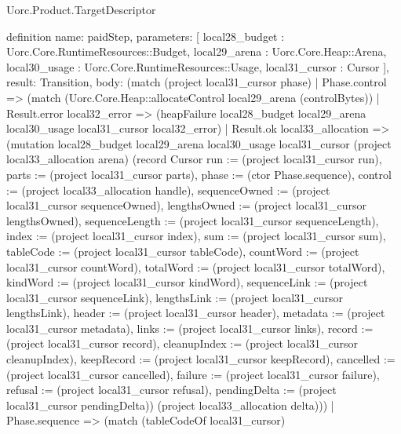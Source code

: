 \begin{lexlean}{Uorc.Product.TargetDescriptor}
\begin{semanticmodule}
definition{
  name: paidStep,
  parameters: [
    local28_budget : Uorc.Core.RuntimeResources::Budget,
    local29_arena : Uorc.Core.Heap::Arena,
    local30_usage : Uorc.Core.RuntimeResources::Usage,
    local31_cursor : Cursor
  ],
  result: Transition,
  body: (match (project local31_cursor phase)
    | Phase.control => (match (Uorc.Core.Heap::allocateControl local29_arena (controlBytes))
      | Result.error local32_error => (heapFailure local28_budget local29_arena local30_usage local31_cursor local32_error)
      | Result.ok local33_allocation => (mutation local28_budget local29_arena local30_usage local31_cursor (project local33_allocation arena) (record Cursor {run := (project local31_cursor run), parts := (project local31_cursor parts), phase := (ctor Phase.sequence), control := (project local33_allocation handle), sequenceOwned := (project local31_cursor sequenceOwned), lengthsOwned := (project local31_cursor lengthsOwned), sequenceLength := (project local31_cursor sequenceLength), index := (project local31_cursor index), sum := (project local31_cursor sum), tableCode := (project local31_cursor tableCode), countWord := (project local31_cursor countWord), totalWord := (project local31_cursor totalWord), kindWord := (project local31_cursor kindWord), sequenceLink := (project local31_cursor sequenceLink), lengthsLink := (project local31_cursor lengthsLink), header := (project local31_cursor header), metadata := (project local31_cursor metadata), links := (project local31_cursor links), record := (project local31_cursor record), cleanupIndex := (project local31_cursor cleanupIndex), keepRecord := (project local31_cursor keepRecord), cancelled := (project local31_cursor cancelled), failure := (project local31_cursor failure), refusal := (project local31_cursor refusal), pendingDelta := (project local31_cursor pendingDelta)}) (project local33_allocation delta)))
    | Phase.sequence => (match (tableCodeOf local31_cursor)
}
\end{semanticmodule}
\end{lexlean}
